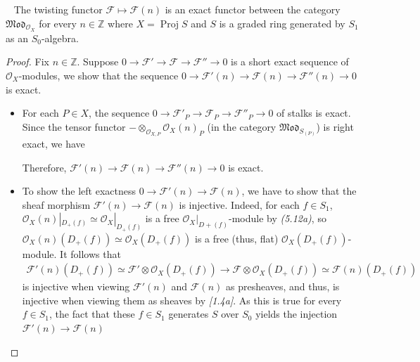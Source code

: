 \documentclass[11pt,a4paper,footinclude=true,headinclude=true]{scrbook} %
\newcommand{\verteq}{\rotatebox{90}{$\,=$}}
\DeclareMathOperator{\Proj}{Proj}
\newcommand{\FF}{\mathscr{F}}
\newcommand{\OO}{\mathcal{O}}
\newcommand{\<}{\langle}
\newcommand{\>}{\rangle}
\newcommand{\MOD}{\mathfrak{Mod}}
\newenvironment{proposition}[2][]
{\renewcommand\theinnercustomprop{#2}\innercustomprop[#1] 
\begin{mdframed}[backgroundcolor=gray!20]\ }
{\end{mdframed}\endinnercustomprop}
\begin{document}
\begin{proposition}{5.B}
    The twisting functor $\FF\mapsto\FF(n)$ is an exact functor between the category $\MOD_{\OO_X}$ for every $n\in\mathbb{Z}$ where $X=\Proj S$ and $S$ is a graded ring generated by $S_1$ as an $S_0$-algebra.
\end{proposition}
\begin{proof}
    Fix $n\in\mathbb{Z}$. Suppose $0\to\FF'\to\FF\to\FF''\to0$ is a short exact sequence of $\OO_X$-modules, we show that the sequence $0\to\FF'(n)\to\FF(n)\to\FF''(n)\to0$ is exact.
    \begin{itemize}
        \item For each $P\in X$, the sequence $0\to\FF'_P\to\FF_P\to\FF''_P\to0$ of stalks is exact. Since the tensor functor $-\otimes_{\OO_{X,P}}\OO_X(n)_P$ (in the category $\MOD_{S_{(P)}}$) is right exact, we have
        \begin{center}
        \end{center}
        Therefore, $\FF'(n)\to\FF(n)\to\FF''(n)\to0$ is exact.
        \item To show the left exactness $0\to\FF'(n)\to\FF(n)$, we have to show that the sheaf morphism $\FF'(n)\to\FF(n)$ is injective. 
        Indeed, for each $f\in S_1$, $\OO_X(n)|_{D_+(f)}\simeq\OO_X|_{D_+(f)}$ is a free $\OO_X|_{D+(f)}$-module by \textit{(5.12a)}, so $\OO_X(n)(D_+(f))\simeq\OO_X(D_+(f))$ is a free (thus, flat) $\OO_X(D_+(f))$-module. It follows that
        \begin{align*}
            \FF'(n)(D_+(f))\simeq\FF'\otimes\OO_X(D_+(f))\longrightarrow\FF\otimes\OO_X(D_+(f))\simeq\FF(n)(D_+(f))
        \end{align*}
        is injective when viewing $\FF'(n)$ and $\FF(n)$ as presheaves, and thus, is injective when viewing them as sheaves by \textit{[1.4a]}. As this is true for every $f\in S_1$, the fact that these $f\in S_1$ generates $S$ over $S_0$ yields the injection $\FF'(n)\to\FF(n)$ 
    \end{itemize}
\end{proof}
\end{document}
